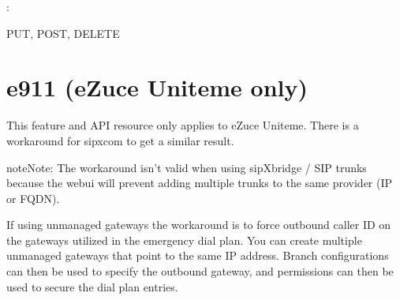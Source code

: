 \documentclass[letterpaper,10pt,english]{sphinxmanual}
\begin{document}
:

\begin{sphinxVerbatim}[commandchars=\\\{\}]

   
   \PYGZbs{}     
        

   
    
\end{sphinxVerbatim}

 PUT, POST, DELETE


\section{e911 (eZuce Uniteme only)}
\label{\detokenize{restapi:e911-ezuce-uniteme-only}}
This feature and API resource only applies to eZuce Uniteme. There is a workaround for sipxcom to get a similar result.

\begin{sphinxadmonition}{note}{Note:}
The workaround isn’t valid when using sipXbridge / SIP trunks because the webui will prevent adding multiple trunks to the same provider (IP or FQDN).
\end{sphinxadmonition}

If using unmanaged gateways the workaround is to force outbound caller ID on the gateways utilized in the emergency dial plan.
You can create multiple unmanaged gateways that point to the same IP address.
Branch configurations can then be used to specify the outbound gateway, and permissions can then be used to secure the dial plan entries.
\end{document}
